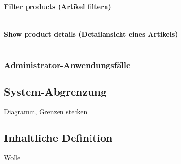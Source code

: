 \paragraph{Filter products (Artikel filtern)}$\;$ \\
\paragraph{Show product details (Detailansicht eines Artikels)}$\;$ \\

\subsubsection{Administrator-Anwendungsfälle}
\subsection{System-Abgrenzung}
Diagramm, Grenzen stecken
\subsection{Inhaltliche Definition}
Wolle